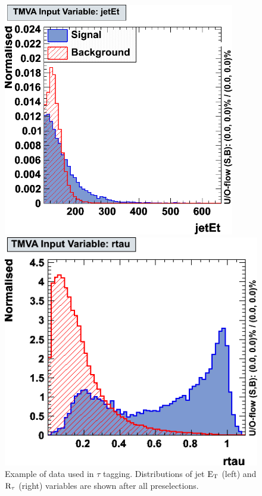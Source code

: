 \documentclass[a4paper]{jpconf}
\begin{document}
\begin{figure}[h]
 \begin{minipage}{7.8cm}
\includegraphics[width=0.9\textwidth]{images/jetet.png}
\end{minipage}
 \hfill
\begin{minipage}{7.8cm}
\includegraphics[width=1.0\textwidth]{images/rtau.png}
\end{minipage}

\caption{Example of data used in $\tau$ tagging.
Distributions of jet ${\rm E}_{\rm T}$ (left) and 
${\rm R}_{\tau}$ (right) variables are shown after all preselections.}
\label{fig:variables}
\end{figure}
\end{document}
